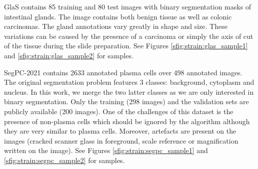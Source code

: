 GlaS \parencite{sirinukunwattana2017gland} contains 85 training and 80 test images with binary segmentation masks of intestinal glands. The image contains both benign tissue as well as colonic carcinomas. The gland annotations vary greatly in shape and size. These variations can be caused by the presence of a carcinoma or simply the axis of cut of the tissue during the slide preparation. See Figures \ref{sfig:strain:glas_sample1} and 
\ref{sfig:strain:glas_sample2} for samples.  

SegPC-2021 \parencite{gupta2021segpc} contains 2633 annotated plasma cells over 498 annotated images. The original segmentation problem features 3 classes: background, cytoplasm and nucleus. In this work, we merge the two latter classes as we are only interested in binary segmentation. Only the training (298 images) and the validation sets are publicly available (200 images). One of the challenges of this dataset is the presence of non-plasma cells which should be ignored by the algorithm although they are very similar to plasma cells. Moreover, artefacts are present on the images (\eg cracked scanner glass in foreground, scale reference or magnification written on the image). See Figures \ref{sfig:strain:segpc_sample1} and \ref{sfig:strain:segpc_sample2} for samples.

